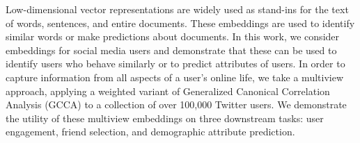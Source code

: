 Low-dimensional vector representations are widely used as stand-ins for the text of words, sentences, and entire documents. These embeddings are used to identify similar words or make predictions about documents. In this work, we consider embeddings for social media users and demonstrate that these can be used to identify users who behave similarly or to predict attributes of users. In order to capture information from all aspects of a user's online life, we take a multiview approach, applying a weighted variant of Generalized Canonical Correlation Analysis (GCCA) to a collection of over 100,000 Twitter users. We demonstrate the utility of these multiview embeddings on three downstream tasks: user engagement, friend selection, and demographic attribute prediction.
